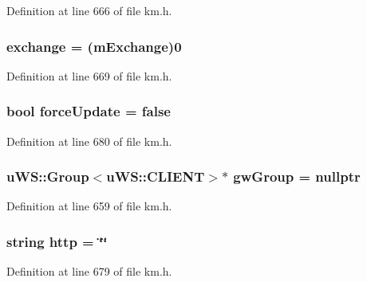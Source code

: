 Definition at line 666 of file km.\+h.

\subsubsection[{\texorpdfstring{exchange}{exchange}}]{ exchange = ({\bf m\+Exchange})0}\hypertarget{class_k_1_1_gw_ab20a118abdc21d41ee2c9a5ae01212db}{}\label{class_k_1_1_gw_ab20a118abdc21d41ee2c9a5ae01212db}


Definition at line 669 of file km.\+h.

\subsubsection[{\texorpdfstring{force\+Update}{forceUpdate}}]{\setlength{\rightskip}{0pt plus 5cm}bool force\+Update = false}\hypertarget{class_k_1_1_gw_a8bdead4768d804f7a81639dee1e456f2}{}\label{class_k_1_1_gw_a8bdead4768d804f7a81639dee1e456f2}


Definition at line 680 of file km.\+h.

\subsubsection[{\texorpdfstring{gw\+Group}{gwGroup}}]{\setlength{\rightskip}{0pt plus 5cm}u\+W\+S\+::\+Group$<$u\+W\+S\+::\+C\+L\+I\+E\+NT$>$$\ast$ gw\+Group = nullptr}\hypertarget{class_k_1_1_gw_a57ae195e4262e03d47cad44c3a0b09f1}{}\label{class_k_1_1_gw_a57ae195e4262e03d47cad44c3a0b09f1}


Definition at line 659 of file km.\+h.

\subsubsection[{\texorpdfstring{http}{http}}]{\setlength{\rightskip}{0pt plus 5cm}string http = \char`\"{}\char`\"{}}\hypertarget{class_k_1_1_gw_a316cb611c8cb905b1c208e7c4f38bb4e}{}\label{class_k_1_1_gw_a316cb611c8cb905b1c208e7c4f38bb4e}


Definition at line 679 of file km.\+h.


